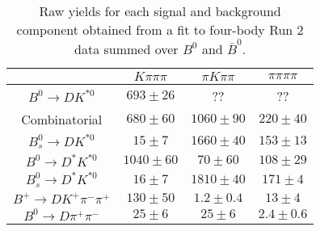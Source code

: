 \begin{table}
  \centering
  \begin{tabular}{cccc}
      \toprule
       & $K\pi\pi\pi$ & $\pi K\pi\pi$ & $\pi\pi\pi\pi$ \\
      \midrule
      $B^0 \to DK^{*0}$ & $693 \pm 26$ & ?? & ?? \\
      Combinatorial & $680 \pm 60$ & $1060 \pm 90$ & $220 \pm 40$ \\
      $B^0_s \to DK^{*0}$ & $15 \pm 7$ & $1660 \pm 40$ & $153 \pm 13$ \\
      $B^0 \to D^*K^{*0}$ & $1040 \pm 60$ & $70 \pm 60$ & $108 \pm 29$ \\
      $B^0_s \to D^*K^{*0}$ & $16 \pm 7$ & $1810 \pm 40$ & $171 \pm 4$ \\
      $B^+ \to DK^+\pi^-\pi^+$ & $130 \pm 50$ & $1.2 \pm 0.4$ & $13 \pm 4$ \\
      $B^0 \to D\pi^+\pi^-$ & $25 \pm 6$ & $25 \pm 6$ & $2.4 \pm 0.6$ \\
      \bottomrule
      \end{tabular}
  \caption{Raw yields for each signal and background component obtained from a fit to four-body Run 2 data summed over $B^0$ and $\bar{B}^0$.}
\label{tab:yields_combined_4body_run2}
\end{table}
